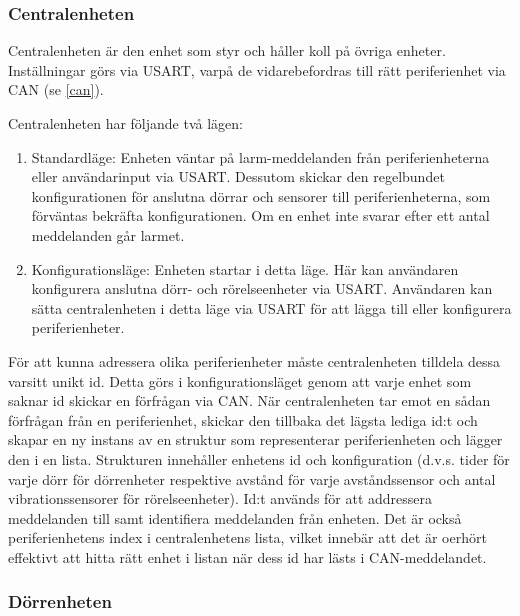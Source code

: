 \documentclass{article}
\begin{document}
\subsubsection{Centralenheten}
Centralenheten är den enhet som styr och håller koll på övriga enheter.
 Inställningar görs via USART, varpå de vidarebefordras till rätt
  periferienhet via CAN (se \ref{can}). 

Centralenheten har följande två lägen:

\begin{enumerate}
    \item Standardläge: Enheten väntar på larm-meddelanden från 
    periferienheterna eller användarinput via USART. Dessutom 
    skickar den regelbundet  konfigurationen för anslutna 
    dörrar och sensorer till periferienheterna, som förväntas 
    bekräfta konfigurationen. Om en enhet inte svarar efter 
    ett antal meddelanden går larmet.
    \item Konfigurationsläge: Enheten startar i detta läge.
     Här kan användaren konfigurera anslutna dörr- och 
     rörelseenheter via USART. Användaren kan sätta centralenheten
      i detta läge via USART för att lägga till eller konfigurera
       periferienheter.
\end{enumerate}

För att kunna adressera olika periferienheter måste centralenheten 
tilldela dessa varsitt unikt id. Detta görs i konfigurationsläget
genom att varje enhet som saknar id skickar en förfrågan via CAN.
När centralenheten tar emot en sådan förfrågan från en periferienhet, 
skickar den tillbaka det lägsta lediga id:t och skapar en ny instans
av en struktur som representerar periferienheten och lägger den i en
lista. Strukturen innehåller enhetens id och konfiguration (d.v.s.
tider för varje dörr för dörrenheter respektive avstånd för varje
avståndssensor och antal vibrationssensorer för rörelseenheter). 
Id:t används för att addressera meddelanden till samt identifiera 
meddelanden från enheten. Det är också periferienhetens index i 
centralenhetens lista, vilket innebär att det är oerhört effektivt
att hitta rätt enhet i listan när dess id har lästs i CAN-meddelandet.





\subsubsection{Dörrenheten}
\end{document}
